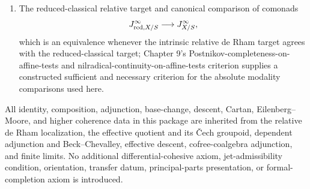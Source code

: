 \begin{theorem}
\begin{enumerate}
\item The reduced-classical relative target and canonical comparison of comonads
\[
    J^{\infty}_{\mathrm{red},X/S}\longrightarrow J^{\infty}_{X/S},
\]
which is an equivalence whenever the intrinsic relative de Rham target agrees with the reduced-classical target; Chapter 9's Postnikov-completeness-on-affine-tests and nilradical-continuity-on-affine-tests criterion supplies a constructed sufficient and necessary criterion for the absolute modality comparisons used here.
\end{enumerate}
All identity, composition, adjunction, base-change, descent, Cartan, Eilenberg--Moore, and higher coherence data in this package are inherited from the relative de Rham localization, the effective quotient and its \v{C}ech groupoid, dependent adjunction and Beck--Chevalley, effective descent, cofree-coalgebra adjunction, and finite limits.  No additional differential-cohesive axiom, jet-admissibility condition, orientation, transfer datum, principal-parts presentation, or formal-completion axiom is introduced.
\end{theorem}

